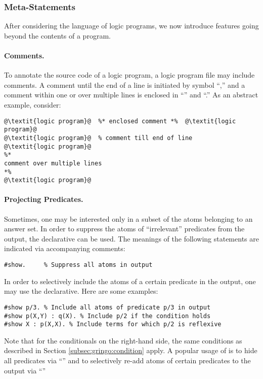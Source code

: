 \subsubsection{Meta-Statements}\label{subsec:gringo:meta}

After considering the language of logic programs,
we now introduce features going beyond the contents of a program.

\paragraph{Comments.}
To annotate the source code of a logic program,
a logic program file may include comments.
A comment until the end of a line is initiated by symbol ``\code{\%},''
and a comment within one or over multiple lines is enclosed
in ``\code{\%*}'' and ``\code{*\%}.''
As an abstract example, consider:
%
\begin{lstlisting}[numbers=none,escapechar=@]
@\textit{logic program}@  %* enclosed comment *%  @\textit{logic program}@
@\textit{logic program}@  % comment till end of line
@\textit{logic program}@
%*
comment over multiple lines
*%
@\textit{logic program}@
\end{lstlisting}

\paragraph{Projecting Predicates.}
%
Sometimes, one may be interested only in a subset of the atoms belonging
to an answer set.
In order to suppress the atoms of ``irrelevant'' predicates from the output,
the  declarative can be used.
The meanings of the following statements are indicated via accompanying comments:
%
\begin{lstlisting}[numbers=none]
#show.     % Suppress all atoms in output
\end{lstlisting}

In order to selectively include the atoms of a certain predicate in the output,
one may use the  declarative.
Here are some examples:
%
\begin{lstlisting}[numbers=none]
#show p/3. % Include all atoms of predicate p/3 in output
#show p(X,Y) : q(X). % Include p/2 if the condition holds
#show X : p(X,X). % Include terms for which p/2 is reflexive 
\end{lstlisting}
%
Note that for the conditionals on the right-hand side, 
the same conditions as described in Section \ref{subsec:gringo:condition} apply.
%
A popular usage of  is to hide all predicates
via ``'' and to selectively re-add atoms of certain predicates
 to the output via ``''

